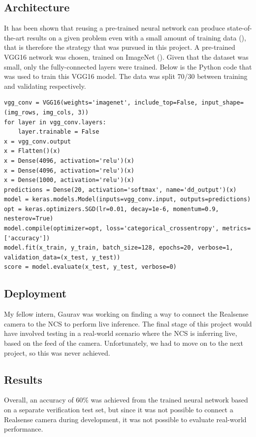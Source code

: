     \subsection{Architecture}
    It has been shown that reusing a pre-trained neural network can produce state-of-the-art results on a given problem even with a small amount of training data (\cite{Razavian_2014_CVPR_Workshops}), that is therefore the strategy that was pursued in this project. A pre-trained VGG16 network was chosen, trained on ImageNet (\cite{imagenet_cvpr09}). Given that the dataset was small, only the fully-connected layers were trained. Below is the Python code that was used to train this VGG16 model. The data was split 70/30 between training and validating respectively.
    \begin{lstlisting}[style=PythonStyle]
vgg_conv = VGG16(weights='imagenet', include_top=False, input_shape=(img_rows, img_cols, 3))
for layer in vgg_conv.layers:
    layer.trainable = False
x = vgg_conv.output
x = Flatten()(x)
x = Dense(4096, activation='relu')(x)
x = Dense(4096, activation='relu')(x)
x = Dense(1000, activation='relu')(x)
predictions = Dense(20, activation='softmax', name='dd_output')(x)
model = keras.models.Model(inputs=vgg_conv.input, outputs=predictions)
opt = keras.optimizers.SGD(lr=0.01, decay=1e-6, momentum=0.9, nesterov=True)
model.compile(optimizer=opt, loss='categorical_crossentropy', metrics=['accuracy'])
model.fit(x_train, y_train, batch_size=128, epochs=20, verbose=1, validation_data=(x_test, y_test))
score = model.evaluate(x_test, y_test, verbose=0)\end{lstlisting}

    \subsection{Deployment}
    My fellow intern, Gaurav was working on finding a way to connect the Realsense camera to the NCS to perform live inference. The final stage of this project would have involved testing in a real-world scenario where the NCS is inferring live, based on the feed of the camera. Unfortunately, we had to move on to the next project, so this was never achieved.

    \subsection{Results}
    Overall, an accuracy of 60\% was achieved from the trained neural network based on a separate verification test set, but since it was not possible to connect a Realsense camera during development, it was not possible to evaluate real-world performance.

